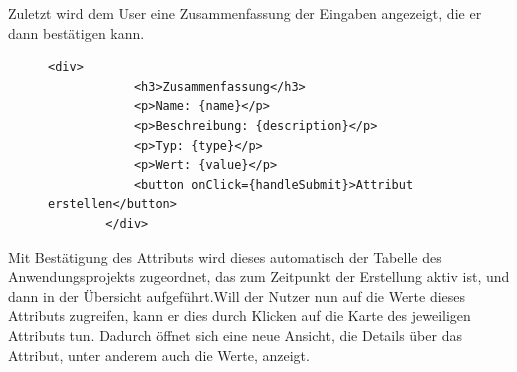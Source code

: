Zuletzt wird dem User eine Zusammenfassung der Eingaben angezeigt, die er dann bestätigen kann.
\begin{figure}[H]
    \begin{lstlisting}[caption=Attribut-Kreation, label=list:attributeCreation3]
        <div>
            <h3>Zusammenfassung</h3>
            <p>Name: {name}</p>
            <p>Beschreibung: {description}</p>
            <p>Typ: {type}</p>
            <p>Wert: {value}</p>
            <button onClick={handleSubmit}>Attribut erstellen</button>
        </div>
    \end{lstlisting}
\end{figure}
Mit Bestätigung des Attributs wird dieses automatisch der Tabelle des Anwendungsprojekts zugeordnet, das zum Zeitpunkt der Erstellung aktiv ist, und dann in der 
Übersicht aufgeführt.Will der Nutzer nun auf die Werte dieses Attributs zugreifen, kann er dies durch Klicken auf die Karte des jeweiligen Attributs tun. Dadurch öffnet
sich eine neue Ansicht, die Details über das Attribut, unter anderem auch die Werte, anzeigt.
